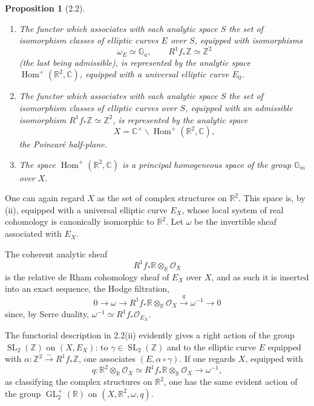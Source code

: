 \documentclass[10pt]{article}
\newcommand{\C}{\mathbb C}
\newcommand{\R}{\mathbb R}
\newcommand{\Z}{\mathbb Z}
\newcommand{\Ga}{\mathbb G_a}
\newcommand{\Gm}{\mathbb G_m}
\newcommand{\GL}{\operatorname{GL}}
\newcommand{\SL}{\operatorname{SL}}
\newcommand{\Hom}{\operatorname{Hom}}
\newcommand{\cO}{\mathcal O}
\newtheorem*{proposition}{Proposition}
\begin{document}
\begin{proposition}[2.2]
\leavevmode
\begin{enumerate}[label=(\roman*)]
\item The functor which associates with each analytic space $S$ the set of isomorphism
classes of elliptic curves $E$ over $S$, equipped with isomorphisms
\[
\omega_E\simeq \Ga,\qquad R^1f_*\Z\simeq \Z^2
\]
(the last being admissible), is represented by the analytic space $\Hom^+(\R^2,\C)$,
equipped with a universal elliptic curve $E_0$.

\item The functor which associates with each analytic space $S$ the set of isomorphism
classes of elliptic curves over $S$, equipped with an admissible isomorphism
$R^1f_*\Z\simeq \Z^2$, is represented by the analytic space
\[
X=\C^\times\backslash\Hom^+(\R^2,\C),
\]
the Poincaré half-plane.

\item The space $\Hom^+(\R^2,\C)$ is a principal homogeneous space of the group
$\Gm$ over $X$.
\end{enumerate}
\end{proposition}

One can again regard $X$ as the set of complex structures on $\R^2$. This space is,
by (ii), equipped with a universal elliptic curve $E_X$, whose local system of real
cohomology is canonically isomorphic to $\R^2$. Let $\omega$ be the invertible sheaf
associated with $E_X$.

The coherent analytic sheaf
\[
R^1f_*\R\otimes_\R\cO_X
\]
is the relative de Rham cohomology sheaf of $E_X$ over $X$, and as such it is inserted
into an exact sequence, the Hodge filtration,
\[
0\longrightarrow \omega\longrightarrow R^1f_*\R\otimes_\R\cO_X
\xrightarrow{q}\omega^{-1}\longrightarrow 0
\]
since, by Serre duality, $\omega^{-1}\simeq R^1f_*\cO_{E_X}$.

The functorial description in 2.2(ii) evidently gives a right action of the group $\SL_2(\Z)$
on $(X,E_X)$: to $\gamma\in\SL_2(\Z)$ and to the elliptic curve $E$ equipped with
$\alpha:\Z^2\xrightarrow{\sim}R^1f_*\Z$, one associates $(E,\alpha\circ\gamma)$. If one
regards $X$, equipped with
\[
q:\R^2\otimes_\R\cO_X\simeq R^1f_*\R\otimes_\R\cO_X\longrightarrow \omega^{-1},
\]
as classifying the complex structures on $\R^2$, one has the same evident action of the
group $\GL_2^+(\R)$ on $(X,\R^2,\omega,q)$.
\end{document}
